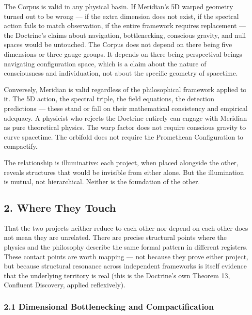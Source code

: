 The Corpus is valid in any physical basin. If Meridian's 5D warped geometry turned out to be wrong — if the extra dimension does not exist, if the spectral action fails to match observation, if the entire framework requires replacement — the Doctrine's claims about navigation, bottlenecking, conscious gravity, and null spaces would be untouched. The Corpus does not depend on there being five dimensions or three gauge groups. It depends on there being perspectival beings navigating configuration space, which is a claim about the nature of consciousness and individuation, not about the specific geometry of spacetime.


Conversely, Meridian is valid regardless of the philosophical framework applied to it. The 5D action, the spectral triple, the field equations, the detection predictions — these stand or fall on their mathematical consistency and empirical adequacy. A physicist who rejects the Doctrine entirely can engage with Meridian as pure theoretical physics. The warp factor does not require conscious gravity to curve spacetime. The orbifold does not require the Promethean Configuration to compactify.


The relationship is illuminative: each project, when placed alongside the other, reveals structures that would be invisible from either alone. But the illumination is mutual, not hierarchical. Neither is the foundation of the other.


\bigskip\noindent\makebox[\textwidth]{\color{rulegray}\rule{5cm}{0.3pt}}\bigskip


\subsection*{2. Where They Touch}


That the two projects neither reduce to each other nor depend on each other does not mean they are unrelated. There are precise structural points where the physics and the philosophy describe the same formal pattern in different registers. These contact points are worth mapping — not because they prove either project, but because structural resonance across independent frameworks is itself evidence that the underlying territory is real (this is the Doctrine's own Theorem 13, Confluent Discovery, applied reflexively).


\subsubsection*{2.1 Dimensional Bottlenecking and Compactification}


